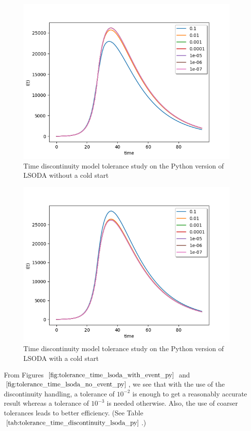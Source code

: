 \begin{figure}[H]
\centering
\includegraphics[width=0.7\linewidth]{./figures/tolerance_time_lsoda_no_event_py}
\caption{Time discontinuity model tolerance study on the Python version of LSODA without a cold start}
\label{fig:tolerance_time_lsoda_no_event_py}
\end{figure}

\begin{figure}[H]
\centering
\includegraphics[width=0.7\linewidth]{./figures/tolerance_time_lsoda_with_event_py}
\caption{Time discontinuity model tolerance study on the Python version of LSODA with a cold start}
\label{fig:tolerance_time_lsoda_with_event_py}
\end{figure}

From Figures $\ref{fig:tolerance_time_lsoda_with_event_py}$ and $\ref{fig:tolerance_time_lsoda_no_event_py}$, we see that with the use of the discontinuity handling, a tolerance of $10^{-2}$ is enough to get a reasonably accurate result whereas a tolerance of $10^{-3}$ is needed otherwise. Also, the use of coarser tolerances leads to better efficiency. (See Table $\ref{tab:tolerance_time_discontinuity_lsoda_py}$.)

